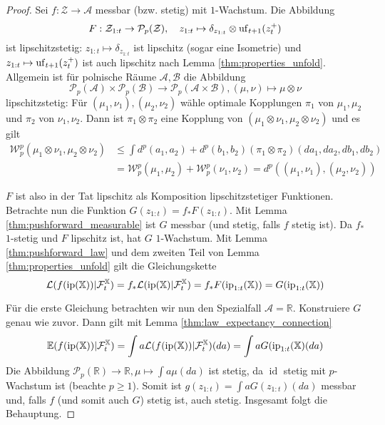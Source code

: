 \begin{proof}
Sei $f:\mathcal{Z}\rightarrow \mathcal{A}$ messbar (bzw. stetig) mit $1$-Wachstum. Die Abbildung 
$$F:\mathcal{Z}_{1:t}\rightarrow\mathcal{P}_p(\mathcal{Z}), \quad z_{1:t}\mapsto \delta_{z_{1:t}} \otimes \operatorname{uf}_{t+1}(z_t^+)$$ 
ist lipschitzstetig: $z_{1:t} \mapsto \delta_{z_{1:t}}$ ist lipschitz (sogar eine Isometrie) und $z_{1:t} \mapsto \operatorname{uf}_{t+1}(z_t^+)$ ist auch lipschitz nach Lemma \ref{thm:properties_unfold}. Allgemein ist für polnische Räume $\mathcal{A},\mathcal{B}$ die Abbildung 
$$\mathcal{P}_p(\mathcal{A})\times \mathcal{P}_p(\mathcal{B}) \rightarrow \mathcal{P}_p(\mathcal{A}\times \mathcal{B}), (\mu,\nu) \mapsto \mu \otimes \nu$$
lipschitzstetig: Für $(\mu_1, \nu_1), (\mu_2, \nu_2)$ wähle optimale Kopplungen $\pi_1$ von $\mu_1, \mu_2$ und $\pi_2$ von $\nu_1,\nu_2$. Dann ist $\pi_1 \otimes \pi_2$ eine Kopplung von $(\mu_1\otimes \nu_1, \mu_2 \otimes \nu_2)$ und es gilt 
\begin{align*}
    \mathcal{W}_p^p(\mu_1\otimes\nu_1, \mu_2\otimes\nu_2) &\leq \int d^p(a_1, a_2) + d^p(b_1, b_2) (\pi_1 \otimes \pi_2)(da_1, da_2, db_1, db_2) \\
    &= \mathcal{W}_p^p(\mu_1, \mu_2) + \mathcal{W}_p^p(\nu_1, \nu_2) = d^p((\mu_1, \nu_1), (\mu_2, \nu_2))
\end{align*}

$F$ ist also in der Tat lipschitz als Komposition lipschitzstetiger Funktionen. Betrachte nun die Funktion $G(z_{1:t}) = f_*F(z_{1:t})$. Mit Lemma \ref{thm:pushforward_measurable} ist $G$ messbar (und stetig, falls $f$ stetig ist). Da $f_*$ $1$-stetig und $F$ lipschitz ist, hat $G$ $1$-Wachstum. Mit Lemma \ref{thm:pushforward_law} und dem zweiten Teil von Lemma \ref{thm:properties_unfold} gilt die Gleichungskette
$$\mathcal{L}(f(\operatorname{ip}(\mathbb{X}))\vert \mathcal{F}_t^\mathbb{X}) = f_*\mathcal{L}(\operatorname{ip}(\mathbb{X}) \vert \mathcal{F}_t^\mathbb{X}) = f_*F(\operatorname{ip}_{1:t}(\mathbb{X}))=G(\operatorname{ip}_{1:t}(\mathbb{X}))$$

Für die erste Gleichung betrachten wir nun den Spezialfall $\mathcal{A}=\mathbb{R}$. Konstruiere $G$ genau wie zuvor. Dann gilt mit Lemma \ref{thm:law_expectancy_connection}
$$\mathbb{E}(f(\operatorname{ip}(\mathbb{X}))\vert \mathcal{F}_t^\mathbb{X}) = \int a \mathcal{L}(f(\operatorname{ip}(\mathbb{X}))\vert \mathcal{F}_t^\mathbb{X})(da) = \int a G(\operatorname{ip}_{1:t}(\mathbb{X})(da)$$
Die Abbildung $\mathcal{P}_p(\mathbb{R}) \rightarrow \mathbb{R}, \mu \mapsto \int a \mu(da)$ ist stetig, da $\operatorname{id}$ stetig mit $p$-Wachstum ist (beachte $p\geq 1$). Somit ist $g(z_{1:t}) = \int a G(z_{1:t})(da)$ messbar und, falls $f$ (und somit auch $G$) stetig ist, auch stetig. Insgesamt folgt die Behauptung.
\end{proof}

